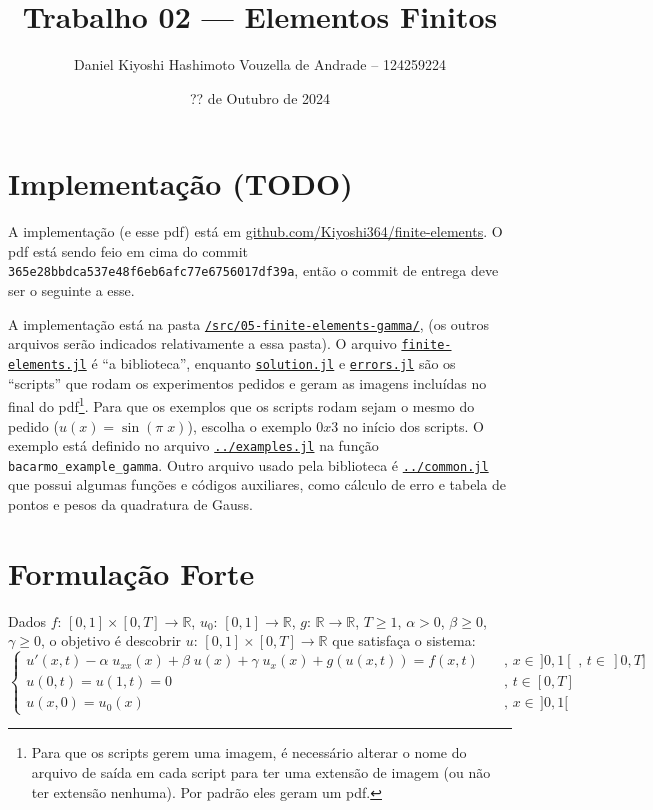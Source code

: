 \documentclass[a4paper]{article}
\title{Trabalho 02 --- Elementos Finitos}
\author{Daniel Kiyoshi Hashimoto Vouzella de Andrade -- 124259224}
\date{?? de Outubro de 2024}
\newcommand{\linkfileraw}[2]{\href{run:../../#1}{\texttt{#2}}}
\newcommand{\linkfile}[2][src/05-finite-elements-gamma/]{\linkfileraw{#1#2}{#2}}
\newcommand{\typ}{:\,}
\begin{document}
\maketitle

\setcounter{section}{-1}
\section{Implementação (TODO)}

A implementação (e esse pdf) está em
\href{https://github.com/Kiyoshi364/finite-elements}{github.com/Kiyoshi364/finite-elements}.
O pdf está sendo feio em cima do commit
\texttt{365e28bbdca537e48f6eb6afc77e6756017df39a},
então o commit de entrega deve ser o seguinte a esse.

A implementação está na pasta
\linkfileraw{/src/05-finite-elements-gamma/}{/src/05-finite-elements-gamma/},
(os outros arquivos serão indicados
relativamente a essa pasta).
O arquivo \linkfile{finite-elements.jl}
é ``a biblioteca'',
enquanto
\linkfile{solution.jl} e \linkfile{errors.jl}
são os ``scripts'' que rodam os experimentos pedidos
e geram as imagens incluídas no final do pdf\footnote{
Para que os scripts gerem uma imagem,
é necessário alterar o nome do arquivo de saída
em cada script para ter uma extensão de imagem
(ou não ter extensão nenhuma).
Por padrão eles geram um pdf.
}.
Para que os exemplos que os scripts rodam
sejam o mesmo do pedido
(\(u(x) = \sin(\pi \; x)\)),
escolha o exemplo \(0x3\)
no início dos scripts.
O exemplo está definido
no arquivo
\linkfile{../examples.jl}
na função \texttt{bacarmo\_example\_gamma}.
Outro arquivo usado pela biblioteca é
\linkfile{../common.jl}
que possui algumas funções e códigos auxiliares,
como cálculo de erro e
tabela de pontos e pesos da quadratura de Gauss.

\section{Formulação Forte}

Dados
\(f \typ [0, 1] \times [0, T] \to \mathbb{R}\),
\(u_0 \typ [0, 1] \to \mathbb{R}\),
\(g \typ \mathbb{R} \to \mathbb{R}\),
\(T \ge 1\),
\(\alpha > 0\),
\(\beta \ge 0\),
\(\gamma \ge 0\),
o objetivo é descobrir \(u \typ [0, 1] \times [0, T] \to \mathbb{R}\)
que satisfaça o sistema:
\[ \begin{cases}
    u'(x, t) - \alpha \; u_{xx}(x) + \beta \; u(x) + \gamma \; u_{x}(x) + g(u(x, t))= f(x, t)
        &\quad\text{, } x \in \,]0, 1[ \text{ , } t \in \,]0, T]
    \\
    u(0, t) = u(1, t) = 0
        &\quad\text{, } t \in [0, T]
    \\
    u(x, 0) = u_0(x)
        &\quad\text{, } x \in \,]0, 1[
\end{cases} \]
\end{document}

